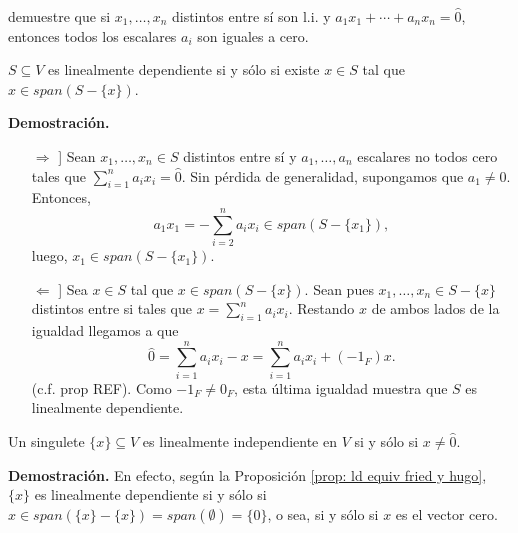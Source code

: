  demuestre que 
si $x_{1}, \ldots , x_{n}$ distintos entre sí son l.i. y
$a_{1} x_{1} + \cdots + a_{n} x_{n} = \hat{0}$, entonces todos
los escalares $a_{i}$ son iguales a cero.



\begin{prop}
	\label{prop: ld equiv fried y hugo}
$S \subseteq V$ es linealmente dependiente si y sólo si 
existe $x \in S$ tal que $x \in span (S - \{ x \})$.
\end{prop}
\noindent
\textbf{Demostración.}
\begin{itemize}
	\item[$\Rightarrow$]] Sean $x_{1},\ldots , x_{n} \in S$
	distintos entre sí y $a_{1}, \ldots , a_{n}$ escalares no todos cero 
	tales que $\sum_{i=1}^{n} a_{i}x_{i} = \hat{0}$.
	Sin pérdida de generalidad, supongamos que 
	$a_{1} \neq 0$. Entonces,
	\[
	a_{1}x_{1} = - \sum_{i=2}^{n} a_{i}x_{i} \in 
	span(S - \{ x_{1} \} ),
	\]
	luego, $x_{1} \in span(S - \{ x_{1} \} )$.
	\item[$\Leftarrow$]] Sea $x \in S$ tal que 
	$x \in span (S - \{ x \})$. Sean pues
	$x_{1}, \ldots ,x_{n} \in S - \{ x \}$ distintos
	entre si 
	tales que $x = \sum_{i = 1}^{n} a_{i}x_{i}$. Restando $x$
	de ambos lados de la igualdad llegamos a que
	\[
	\hat{0} = \sum_{i = 1}^{n} a_{i}x_{i} - x
	= \sum_{i = 1}^{n} a_{i}x_{i} + (-1_{F}) x.
	\]
	(c.f. prop REF). Como $-1_{F} \neq 0_{F}$, esta última
	igualdad muestra que $S$ es linealmente dependiente.
	
\end{itemize}

\QEDB
\vspace{0.2cm}

\begin{prop}
	\label{prop: singulete x l.i. sii x no cero}
Un singulete $\{ x \} \subseteq V$ es linealmente independiente en $V$
si y sólo si $x \neq \hat{0}$.
\end{prop}
\noindent
\textbf{Demostración.}
En efecto, según la Proposición
\ref{prop: ld equiv fried y hugo},
$\{ x \}$ es linealmente dependiente si y sólo si 
$x \in span (\{ x \} - \{ x \} ) = 
span(\emptyset)= \{ 0 \}$, 
o sea, si y sólo si $x$ es el vector cero.
\QEDB
\vspace{0.2cm}



